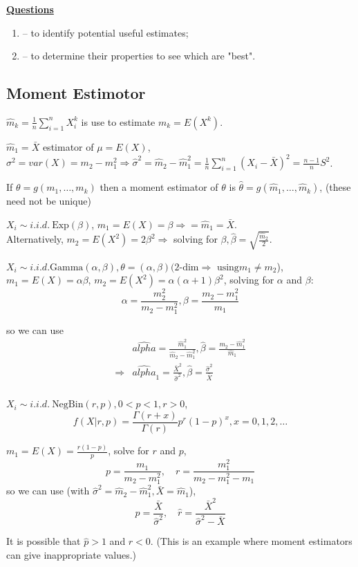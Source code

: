 \documentclass[english, 11pt]{article}
\begin{document}
\underline{\textbf{Questions}}\\
\begin{enumerate}[1)]
\item -- to identify potential useful estimates;
\item -- to determine their properties to see which are "best".
\end{enumerate}

\subsection{Moment Estimotor}
\begin{defn}[Moments]\label{defn:32}
$\hat{m}_k=\frac{1}{n}\sum_{i=1}^nX_i^k$ is use to estimate $m_k=E(X^k)$.
\end{defn}
$\hat{m}_1=\bar{X}$ estimator of $\mu=E(X)$, $\sigma^2=var(X)=m_2-m_1^2\Rightarrow\hat{\sigma}^2=\hat{m}_2-\hat{m}_1^2=\frac{1}{n}\sum_{i=1}^n(X_i-\bar{X})^2=\frac{n-1}{n}S^2$.

If $\theta=g(m_1, \dots, m_k)$ then a moment estimator of $\theta$ is $\hat{\theta}=g(\hat{m}_1, \dots, \hat{m}_k)$,  (these need not be unique)

\begin{exmp}\label{exmp:33}
$X_i\sim i.i.d. ~\text{Exp}(\beta)$, $m_1=E(X)=\beta\Rightarrow=\hat{m}_1=\bar{X}$.\\
Alternatively, $m_2=E(X^2)=2\beta^2\Rightarrow$ solving for $\beta, \hat{\beta}=\sqrt{\frac{\hat{m}_2}{2}}$.
\end{exmp}

\begin{exmp}\label{exmp:34}
$X_i\sim i.i.d. \text{Gamma}(\alpha, \beta), \theta=(\alpha, \beta) (\text{2-dim}\Rightarrow \text{ using} m_1\not=m_2$), $m_1=E(X)=\alpha\beta$, $m_2=E(X^2)=\alpha(\alpha+1)\beta^2$, solving for $\alpha$ and $\beta$:
$$
\alpha=\frac{m_2^2}{m_2-m_1^2}, \beta=\frac{m_2-m_1^2}{m_1}
$$

so we can use 
$$
\begin{aligned}
&\hat{alpha}=\frac{\hat{m}_1^2}{\hat{m}_2-\hat{m}_1^2}, \hat{\beta}=\frac{{m}_2-\hat{m}_1^2}{\hat{m}_1}\\
\Rightarrow&\hat{alpha}_1=\frac{\bar{X}^2}{\hat{\sigma}^2}, \hat{\beta}=\frac{\hat{\sigma}^2}{\bar{X}}\\
\end{aligned}
$$
\end{exmp}

\begin{exmp}\label{exmp:35}
$X_i\sim i.i.d.~\text{NegBin}(r, p), 0<p<1, r>0$, 
$$
f(X|r, p)=\frac{\Gamma(r+x)}{\Gamma(r)}p^r(1-p)^x, x = 0, 1, 2, \dots
$$

$m_1=E(X)=\frac{r(1-p)}{p}$, solve for $r$ and $p$, 
$$
p=\frac{m_1}{m_2-m_1^2},\quad r=\frac{m_1^2}{m_2-m_1^2-m_1}
$$
so we can use (with $\hat{\sigma}^2=\hat{m}_2-\hat{m}_1^2, \bar{X}=\hat{m}_1$), 
$$
\hat{p}=\frac{\bar{X}}{\hat{\sigma}^2}, \quad \hat{r}=\frac{\bar{X}^2}{\hat{\sigma}^2-\bar{X}}
$$

It is possible that $\hat{p}>1$ and $\hat{r}<0$. (This is an example where moment estimators can give inappropriate values.)
\end{exmp}
\end{document}
